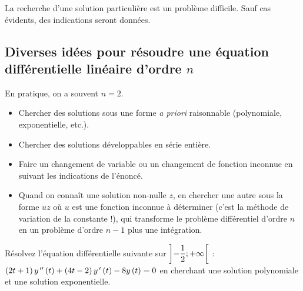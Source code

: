 \begin{rem}
La recherche d'une solution particulière est un problème difficile. Sauf cas évidents, des indications seront données.
\end{rem}

\subsection{Diverses idées pour résoudre une équation différentielle linéaire d'ordre \(n\)}

En pratique, on a souvent \(n=2\).

\begin{itemize}
    \item Chercher des solutions sous une forme \textit{a priori} raisonnable (polynomiale, exponentielle, etc.). \\
    \item Chercher des solutions développables en série entière. \\
    \item Faire un changement de variable ou un changement de fonction inconnue en suivant les indications de l'énoncé. \\
    \item Quand on connaît une solution non-nulle \(z\), en chercher une autre sous la forme \(uz\) où \(u\) est une fonction inconnue à déterminer (c'est la méthode de variation de la constante !), qui transforme le problème différentiel d'ordre \(n\) en un problème d'ordre \(n-1\) plus une intégration.
\end{itemize}

\begin{exo}
Résolvez l'équation différentielle suivante sur \(\left]-\dfrac{1}{2};+\infty\right[\) : \(\left(2t+1\right)y^{\,\prime\prime}\left(t\right)+\left(4t-2\right)y^{\,\prime}\left(t\right)-8y\left(t\right)=0\) en cherchant une solution polynomiale et une solution exponentielle.
\end{exo}

